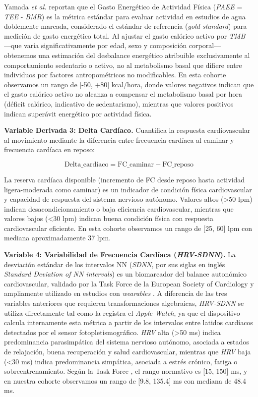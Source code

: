 Yamada \textit{et al.} \cite{Yamada2019} reportan que el Gasto Energético de Actividad Física (\textit{PAEE} = \textit{TEE} - \textit{BMR}) es la métrica estándar para evaluar actividad en estudios de agua doblemente marcada, considerado el estándar de referencia (\textit{gold standard}) para medición de gasto energético total. Al ajustar el gasto calórico activo por \textit{TMB} —que varía significativamente por edad, sexo y composición corporal— obtenemos una estimación del desbalance energético atribuible exclusivamente al comportamiento sedentario o activo, no al metabolismo basal que difiere entre individuos por factores antropométricos no modificables. En esta cohorte observamos un rango de [-50, +80] kcal/hora, donde valores negativos indican que el gasto calórico activo no alcanza a compensar el metabolismo basal por hora (déficit calórico, indicativo de sedentarismo), mientras que valores positivos indican superávit energético por actividad física.

\textbf{Variable Derivada 3: Delta Cardíaco.} Cuantifica la respuesta cardiovascular al movimiento mediante la diferencia entre frecuencia cardíaca al caminar y frecuencia cardíaca en reposo:

\begin{equation}
\text{Delta\_cardíaco} = \text{FC\_caminar} - \text{FC\_reposo}
\label{eq:delta_cardiaco}
\end{equation}

La reserva cardíaca disponible (incremento de FC desde reposo hasta actividad ligera-moderada como caminar) es un indicador de condición física cardiovascular y capacidad de respuesta del sistema nervioso autónomo. Valores altos (>50 lpm) indican desacondicionamiento o baja eficiencia cardiovascular, mientras que valores bajos (<30 lpm) indican buena condición física con respuesta cardiovascular eficiente. En esta cohorte observamos un rango de [25, 60] lpm con mediana aproximadamente 37 lpm.

\textbf{Variable 4: Variabilidad de Frecuencia Cardíaca (\textit{HRV-SDNN}).} La desviación estándar de los intervalos NN (\textit{SDNN}, por sus siglas en inglés \textit{Standard Deviation of NN intervals}) es un biomarcador del balance autonómico cardiovascular, validado por la Task Force de la European Society of Cardiology \cite{TaskForce1996} y ampliamente utilizado en estudios con \textit{wearables} \cite{Laborde2017}. A diferencia de las tres variables anteriores que requieren transformaciones algebraicas, \textit{HRV-SDNN} se utiliza directamente tal como la registra el \textit{Apple Watch}, ya que el dispositivo calcula internamente esta métrica a partir de los intervalos entre latidos cardíacos detectados por el sensor fotopletismográfico. \textit{HRV} alta (>50 ms) indica predominancia parasimpática del sistema nervioso autónomo, asociada a estados de relajación, buena recuperación y salud cardiovascular, mientras que \textit{HRV} baja (<30 ms) indica predominancia simpática, asociada a estrés crónico, fatiga o sobreentrenamiento. Según la Task Force \cite{TaskForce1996}, el rango normativo es [15, 150] ms, y en nuestra cohorte observamos un rango de [9.8, 135.4] ms con mediana de 48.4 ms.

